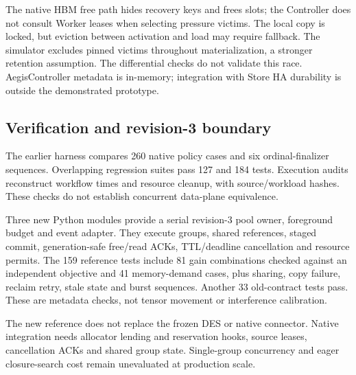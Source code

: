The native HBM free path hides recovery keys and frees slots; the Controller
does not consult Worker leases when selecting pressure victims. The local
copy is locked, but eviction between activation and load may require fallback.
The simulator excludes pinned victims throughout materialization, a stronger
retention assumption. The differential checks do not validate this race.
AegisController metadata is in-memory; integration with Store HA durability
is outside the demonstrated prototype.

\subsection{Verification and revision-3 boundary}
The earlier harness compares 260 native policy cases and six ordinal-finalizer
sequences. Overlapping regression suites pass 127 and 184 tests. Execution
audits reconstruct workflow times and resource cleanup, with source/workload
hashes. These checks do not establish concurrent data-plane equivalence.

Three new Python modules provide a serial revision-3 pool owner, foreground
budget and event adapter. They execute groups, shared references, staged
commit, generation-safe free/read ACKs, TTL/deadline cancellation and resource
permits. The 159 reference tests include 81 gain combinations checked against
an independent objective and 41 memory-demand cases, plus sharing, copy failure,
reclaim retry, stale state and burst sequences. Another 33 old-contract tests
pass. These are metadata checks, not tensor movement or interference calibration.

The new reference does not replace the frozen DES or native connector. Native
integration needs allocator lending and reservation hooks, source leases, cancellation
ACKs and shared group state. Single-group concurrency and eager closure-search
cost remain unevaluated at production scale.
